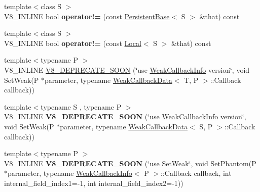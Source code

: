 \begin{DoxyCompactItemize}
\item 
\hypertarget{classv8_1_1PersistentBase_a5bfacec9ab828f9aa7abdb980481589a}{}{\footnotesize template$<$class S $>$ }\\V8\+\_\+\+I\+N\+L\+I\+N\+E bool {\bfseries operator!=} (const \hyperlink{classv8_1_1PersistentBase}{Persistent\+Base}$<$ S $>$ \&that) const \label{classv8_1_1PersistentBase_a5bfacec9ab828f9aa7abdb980481589a}

\item 
\hypertarget{classv8_1_1PersistentBase_a467b78e40a53fb8324369d8a7a147800}{}{\footnotesize template$<$class S $>$ }\\V8\+\_\+\+I\+N\+L\+I\+N\+E bool {\bfseries operator!=} (const \hyperlink{classv8_1_1Local}{Local}$<$ S $>$ \&that) const \label{classv8_1_1PersistentBase_a467b78e40a53fb8324369d8a7a147800}

\item 
{\footnotesize template$<$typename P $>$ }\\V8\+\_\+\+I\+N\+L\+I\+N\+E \hyperlink{classv8_1_1PersistentBase_ac69eff0419916b3f58e60697f5c82fbe}{V8\+\_\+\+D\+E\+P\+R\+E\+C\+A\+T\+E\+\_\+\+S\+O\+O\+N} (\char`\"{}use \hyperlink{classv8_1_1WeakCallbackInfo}{Weak\+Callback\+Info} version\char`\"{}, void Set\+Weak(P $\ast$parameter, typename \hyperlink{classv8_1_1WeakCallbackData}{Weak\+Callback\+Data}$<$ T, P $>$\+::Callback callback))
\item 
\hypertarget{classv8_1_1PersistentBase_a70c654dfbfe1a346c43dc0f68928f6ad}{}{\footnotesize template$<$typename S , typename P $>$ }\\V8\+\_\+\+I\+N\+L\+I\+N\+E {\bfseries V8\+\_\+\+D\+E\+P\+R\+E\+C\+A\+T\+E\+\_\+\+S\+O\+O\+N} (\char`\"{}use \hyperlink{classv8_1_1WeakCallbackInfo}{Weak\+Callback\+Info} version\char`\"{}, void Set\+Weak(P $\ast$parameter, typename \hyperlink{classv8_1_1WeakCallbackData}{Weak\+Callback\+Data}$<$ S, P $>$\+::Callback callback))\label{classv8_1_1PersistentBase_a70c654dfbfe1a346c43dc0f68928f6ad}

\item 
\hypertarget{classv8_1_1PersistentBase_a91ebb0af8cf7fe1a1762c6806940bf53}{}{\footnotesize template$<$typename P $>$ }\\V8\+\_\+\+I\+N\+L\+I\+N\+E {\bfseries V8\+\_\+\+D\+E\+P\+R\+E\+C\+A\+T\+E\+\_\+\+S\+O\+O\+N} (\char`\"{}use Set\+Weak\char`\"{}, void Set\+Phantom(P $\ast$parameter, typename \hyperlink{classv8_1_1WeakCallbackInfo}{Weak\+Callback\+Info}$<$ P $>$\+::Callback callback, int internal\+\_\+field\+\_\+index1=-\/1, int internal\+\_\+field\+\_\+index2=-\/1))\label{classv8_1_1PersistentBase_a91ebb0af8cf7fe1a1762c6806940bf53}


\end{DoxyCompactItemize}
